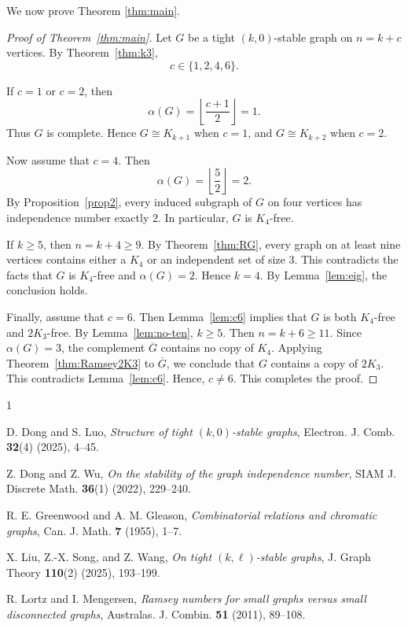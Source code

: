 \def\CTeXPreproc{Created by ctex v0.2.14, don't edit!}\def\CTeXPreproc{Created by ctex v0.2.14, don't edit!}\documentclass[11pt, twoside]{article}
\begin{document}
We now prove Theorem \ref{thm:main}.

\begin{proof}[Proof of Theorem~\ref{thm:main}]
Let $G$ be a tight $(k,0)$-stable graph on $n=k+c$ vertices. By Theorem~\ref{thm:k3},
\[
c\in\{1,2,4,6\}.
\]

If $c=1$ or $c=2$, then
\[
\alpha(G)=\left\lfloor \frac{c+1}{2}\right\rfloor=1.
\]
Thus $G$ is complete. Hence $G\cong K_{k+1}$ when $c=1$, and
$G\cong K_{k+2}$ when $c=2$.

Now assume that $c=4$. Then
\[
\alpha(G)=\left\lfloor \frac{5}{2}\right\rfloor=2.
\]
By Proposition~\ref{prop2}, every induced subgraph of $G$ on
four vertices has independence number exactly $2$. In particular, $G$ is
$K_4$-free.

If $k\geq 5$, then $n=k+4\geq 9$. By Theorem~\ref{thm:RG}, every
graph on at least nine vertices contains either a $K_4$ or an independent
set of size $3$. This contradicts the facts that $G$ is $K_4$-free and
$\alpha(G)=2$. Hence $k=4$. By Lemma~\ref{lem:eig}, the conclusion holds.

Finally, assume that $c=6$. Then Lemma~\ref{lem:c6} implies
that $G$ is both $K_4$-free and $2K_3$-free. By Lemma~\ref{lem:no-ten}, $k\geq 5$. Then
$n=k+6\geq 11$. Since $\alpha(G)=3$, the complement $\overline{G}$ contains no copy of $K_4$.
Applying Theorem~\ref{thm:Ramsey2K3} to $\overline{G}$, we conclude that $G$ contains a copy of $2K_3$.
This contradicts Lemma~\ref{lem:c6}. Hence, $c\neq6$. This completes the proof.
\end{proof}



\begin{thebibliography}{1}
\vskip 0.2cm
 
 D. Dong and S. Luo, \emph{Structure of tight $(k,0)$-stable graphs}, Electron. J. Comb. \textbf{32}(4) (2025), 4--45.
 
 Z. Dong and Z. Wu, \emph{On the stability of the graph independence number}, SIAM J. Discrete Math. \textbf{36}(1) (2022), 229--240.
 
 R. E. Greenwood and A. M. Gleason, \emph{Combinatorial relations and chromatic graphs}, Can. J. Math. \textbf{7} (1955), 1--7.
 
 X. Liu, Z.-X. Song, and Z. Wang, \emph{On tight $(k,\ell)$-stable graphs}, J. Graph Theory \textbf{110}(2) (2025), 193--199.
 
 R. Lortz and I. Mengersen, \emph{Ramsey numbers for small graphs versus small disconnected graphs}, Australas. J. Combin. \textbf{51} (2011), 89--108.
 













\end{thebibliography}
\clearpage
\end{document}
